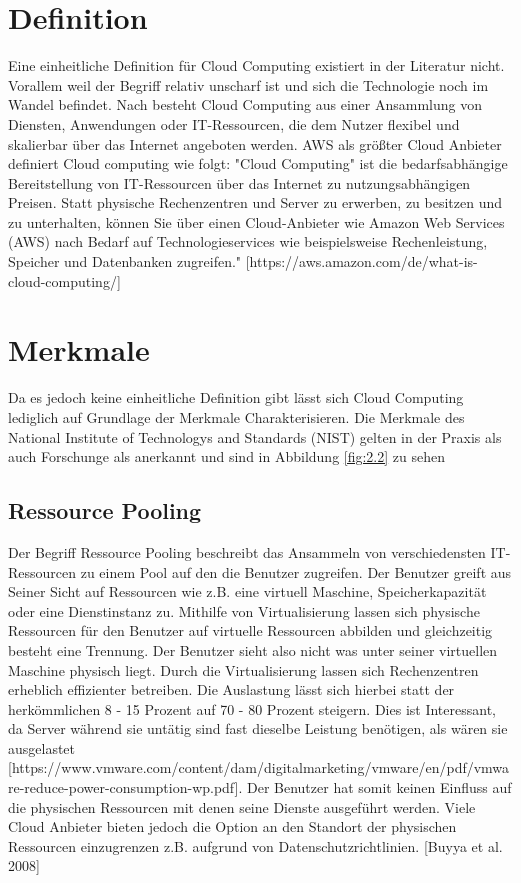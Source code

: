 \section{Definition}
Eine einheitliche Definition  für Cloud Computing existiert in der Literatur nicht. Vorallem weil der Begriff relativ unscharf ist und sich die Technologie noch im Wandel befindet. Nach besteht Cloud Computing aus einer Ansammlung von Diensten, Anwendungen oder IT-Ressourcen, die dem Nutzer flexibel und skalierbar über das Internet angeboten werden. AWS als größter Cloud Anbieter definiert Cloud computing wie folgt: "Cloud Computing" ist die bedarfsabhängige Bereitstellung von IT-Ressourcen über das Internet zu nutzungsabhängigen Preisen. Statt physische Rechenzentren und Server zu erwerben, zu besitzen und zu unterhalten, können Sie über einen Cloud-Anbieter wie Amazon Web Services (AWS) nach Bedarf auf Technologieservices wie beispielsweise Rechenleistung, Speicher und Datenbanken zugreifen." [https://aws.amazon.com/de/what-is-cloud-computing/] 

\section{Merkmale}
Da es jedoch keine einheitliche Definition gibt lässt sich Cloud Computing lediglich auf Grundlage der Merkmale Charakterisieren. Die Merkmale des National Institute of Technologys and Standards (NIST) gelten in der Praxis als auch Forschunge als anerkannt und sind in Abbildung \ref{fig:2.2} zu sehen
\subsection{Ressource Pooling}
Der Begriff Ressource Pooling beschreibt das Ansammeln von verschiedensten IT-Ressourcen zu einem Pool auf den die Benutzer zugreifen. Der Benutzer greift aus Seiner Sicht auf Ressourcen wie z.B. eine virtuell Maschine, Speicherkapazität oder eine Dienstinstanz zu. Mithilfe von Virtualisierung lassen sich physische Ressourcen für den Benutzer auf virtuelle Ressourcen abbilden und gleichzeitig besteht eine Trennung. Der Benutzer sieht also nicht was unter seiner virtuellen Maschine physisch liegt. Durch die Virtualisierung lassen sich Rechenzentren erheblich effizienter betreiben. Die Auslastung lässt sich hierbei statt der herkömmlichen 8 - 15 Prozent auf 70 - 80 Prozent steigern. Dies ist Interessant, da Server während sie untätig sind fast dieselbe Leistung benötigen, als wären sie ausgelastet [https://www.vmware.com/content/dam/digitalmarketing/vmware/en/pdf/vmware-reduce-power-consumption-wp.pdf]. Der Benutzer hat somit keinen Einfluss auf die physischen Ressourcen mit denen seine Dienste ausgeführt werden. Viele Cloud Anbieter bieten jedoch die Option an den Standort der physischen Ressourcen einzugrenzen z.B. aufgrund von Datenschutzrichtlinien.  [Buyya et al. 2008]

